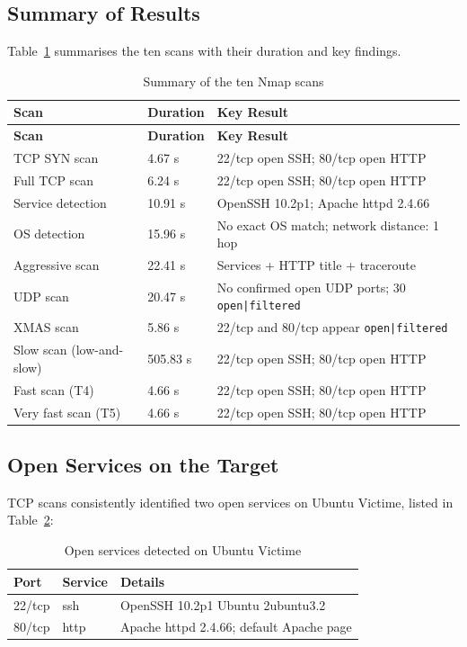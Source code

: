 \documentclass[12pt,a4paper]{report}
\begin{document}
\subsection{Summary of Results}

Table~\ref{tab:synthese-scans} summarises the ten scans with their duration and key findings.

\begin{longtable}{p{3.2cm}p{2.2cm}p{7.5cm}}
\caption{Summary of the ten Nmap scans} \label{tab:synthese-scans} \\
\toprule
\textbf{Scan} & \textbf{Duration} & \textbf{Key Result} \\
\midrule
\endfirsthead
\toprule
\textbf{Scan} & \textbf{Duration} & \textbf{Key Result} \\
\midrule
\endhead
TCP SYN scan & 4.67 s & 22/tcp open SSH; 80/tcp open HTTP \\
Full TCP scan & 6.24 s & 22/tcp open SSH; 80/tcp open HTTP \\
Service detection & 10.91 s & OpenSSH 10.2p1; Apache httpd 2.4.66 \\
OS detection & 15.96 s & No exact OS match; network distance: 1 hop \\
Aggressive scan & 22.41 s & Services + HTTP title + traceroute \\
UDP scan & 20.47 s & No confirmed open UDP ports; 30 \texttt{open|filtered} \\
XMAS scan & 5.86 s & 22/tcp and 80/tcp appear \texttt{open|filtered} \\
Slow scan (low-and-slow) & 505.83 s & 22/tcp open SSH; 80/tcp open HTTP \\
Fast scan (T4) & 4.66 s & 22/tcp open SSH; 80/tcp open HTTP \\
Very fast scan (T5) & 4.66 s & 22/tcp open SSH; 80/tcp open HTTP \\
\bottomrule
\end{longtable}

\subsection{Open Services on the Target}

TCP scans consistently identified two open services on Ubuntu Victime, listed in Table~\ref{tab:services}:

\begin{table}[H]
\centering
\caption{Open services detected on Ubuntu Victime}
\label{tab:services}
\begin{tabular}{lll}
\toprule
\textbf{Port} & \textbf{Service} & \textbf{Details} \\
\midrule
22/tcp & ssh & OpenSSH 10.2p1 Ubuntu 2ubuntu3.2 \\
80/tcp & http & Apache httpd 2.4.66; default Apache page \\
\bottomrule
\end{tabular}
\end{table}
\end{document}
